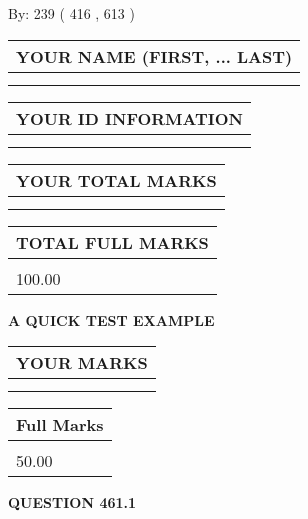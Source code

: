 \documentclass[12pt]{article}
\begin{document}
   
\hspace{1.0in} By: 
 239 ( 416 ,  613 )
   
   
   
   
\newpage 
\setcounter{page}{ 
   461001 } 
   
   
   
   
\noindent\begin{tabular}{|l|}
\hline
YOUR NAME (FIRST, ... LAST)  \\
\hline
 \\ 
 \\ 
\hline
\end{tabular}
\hspace{0.05in} \begin{tabular}{|l|}
\hline
 YOUR   ID   INFORMATION  \\
\hline
 \\ 
 \\ 
\hline
\end{tabular}
   
   
\vspace{0.2in}\noindent\begin{tabular}{|l|}
\hline
YOUR TOTAL MARKS  \\
\hline
 \\ 
 \\ 
\hline
\end{tabular}
\hspace{0.05in} \begin{tabular}{|l|}
\hline
TOTAL FULL MARKS  \\
\hline
 \\ 
100.00 \\
\hline
\end{tabular}
   
   
 \vspace{0.2in}
{\LARGE {\textbf{ A QUICK TEST EXAMPLE}}}
   
   
  
\vspace{0.2in}
  
\noindent\begin{tabular}{|l|}
\hline
 YOUR MARKS  \\
\hline
 \\ 
 \\ 
\hline
\end{tabular}
\hspace{0.05in} \begin{tabular}{|l|}
\hline
 Full Marks  \\
\hline
 \\ 
50.00 \\
\hline
\end{tabular}
{\textbf{\Large{QUESTION
461.1 
}}}
  
\end{document}
